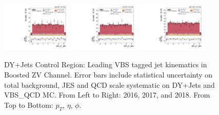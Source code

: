 \begin{figure}[!ht]
  \includegraphics[width=0.30\textwidth]{analysis_plots/2016_zv/cr_vjets_l/vbf_j1_phi.pdf}
  \includegraphics[width=0.30\textwidth]{analysis_plots/2017_zv/cr_vjets_l/vbf_j1_phi.pdf}
  \includegraphics[width=0.30\textwidth]{analysis_plots/2018_zv/cr_vjets_l/vbf_j1_phi.pdf} \\
  \caption[DY+Jets Control Region: Leading VBS tagged jet kinematics in Boosted ZV Channel]%
  {DY+Jets Control Region: Leading VBS tagged jet kinematics in Boosted ZV Channel.
    Error bars include statistical uncertainty on total background,
    JES and QCD scale systematic on DY+Jets and VBS\_QCD MC\@. From Left to Right: 2016,
    2017, and 2018. From Top to Bottom: \( p_T \), \( \eta \), \( \phi \).}%
  \label{fig:zv-cr-vjets-l-vbs1-pt-eta-m}
\end{figure}

